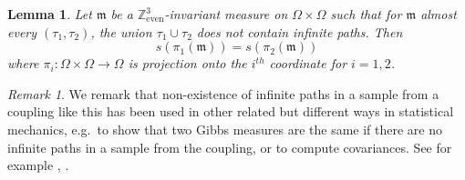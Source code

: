 \documentclass[11pt]{article}
\newtheorem{lemma}[thm]{Lemma}
\theoremstyle{remark}
\newtheorem{rem}[thm]{Remark}
\theoremstyle{definition}
\newcommand{\Z}{\mathbb{Z}}
\newcommand{\threeeven}{\Z^3_{\text{even}}}
\begin{document}
\begin{lemma}\label{lem:no_infinite_paths}
Let $\mathfrak m$ be a $\threeeven$-invariant measure on $\Omega\times \Omega$ such that for $\mathfrak m$ almost every $(\tau_1, \tau_2)$, the union $\tau_1\cup \tau_2$ does not contain infinite paths. Then
$$s(\pi_1(\mathfrak m))=s(\pi_2(\mathfrak m))$$
where $\pi_i:\Omega\times \Omega\to \Omega$ is projection onto the $i^{th}$ coordinate for $i=1,2$. 
\end{lemma}

\begin{rem}
    We remark that non-existence of infinite paths in a sample from a coupling like this has been used in other related but different ways in statistical mechanics, e.g.\ to show that two Gibbs measures are the same if there are no infinite paths in a sample from the coupling, or to compute covariances. See for example \cite{van_den_Berg}, \cite{van_den_Berg-Steif}.
\end{rem}
\end{document}
